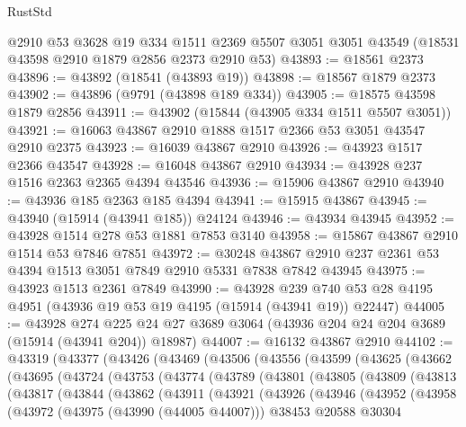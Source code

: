 \begin{lexlean}{RustStd}
\begin{coremodule}
    @2910
    @53
    @3628
    @19
    @334
    @1511
    @2369
    @5507
    @3051
    @3051
    @43549
    (@18531 @43598 @2910 @1879 @2856 @2373 @2910 @53)
@43893 := @18561 @2373
@43896 := @43892 (@18541 (@43893 @19))
@43898 := @18567 @1879 @2373
@43902 := @43896 (@9791 (@43898 @189 @334))
@43905 := @18575 @43598 @1879 @2856
@43911 := @43902 (@15844 (@43905 @334 @1511 @5507 @3051))
@43921 := @16063 @43867 @2910 @1888 @1517 @2366 @53 @3051 @43547 @2910 @2375
@43923 := @16039 @43867 @2910
@43926 := @43923 @1517 @2366 @43547
@43928 := @16048 @43867 @2910
@43934 := @43928 @237 @1516 @2363 @2365 @4394 @43546
@43936 := @15906 @43867 @2910
@43940 := @43936 @185 @2363 @185 @4394
@43941 := @15915 @43867
@43945 := @43940 (@15914 (@43941 @185)) @24124
@43946 := @43934 @43945
@43952 := @43928 @1514 @278 @53 @1881 @7853 @3140
@43958 := @15867 @43867 @2910 @1514 @53 @7846 @7851
@43972 := @30248 @43867 @2910 @237 @2361 @53 @4394 @1513 @3051 @7849 @2910 @5331 @7838 @7842 @43945
@43975 := @43923 @1513 @2361 @7849
@43990 := @43928
    @239
    @740
    @53
    @28
    @4195
    @4951
    (@43936 @19 @53 @19 @4195 (@15914 (@43941 @19)) @22447)
@44005 := @43928
    @274
    @225
    @24
    @27
    @3689
    @3064
    (@43936 @204 @24 @204 @3689 (@15914 (@43941 @204)) @18987)
@44007 := @16132 @43867 @2910
@44102 := @43319
    (@43377
      (@43426
        (@43469
          (@43506
            (@43556
              (@43599
                (@43625
                  (@43662
                    (@43695
                      (@43724
                        (@43753
                          (@43774
                            (@43789
                              (@43801
                                (@43805
                                  (@43809
                                    (@43813
                                      (@43817
                                        (@43844
                                          (@43862
                                            (@43911
                                              (@43921
                                                (@43926
                                                  (@43946
                                                    (@43952
                                                      (@43958
                                                        (@43972
                                                          (@43975 (@43990 (@44005 @44007)))
                                                          @38453
                                                          @20588
                                                          @30304

\end{coremodule}
\end{lexlean}
